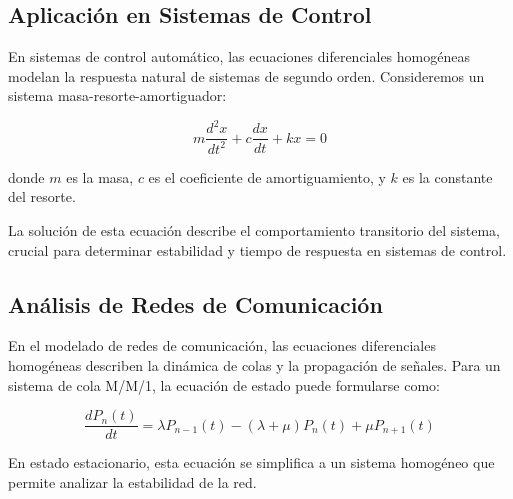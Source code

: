 \subsection{Aplicación en Sistemas de Control}

En sistemas de control automático, las ecuaciones diferenciales homogéneas modelan la respuesta natural de sistemas de segundo orden. Consideremos un sistema masa-resorte-amortiguador:

\begin{equation}
    m \frac{d^2 x}{dt^2} + c \frac{dx}{dt} + kx = 0
\end{equation}

donde $m$ es la masa, $c$ es el coeficiente de amortiguamiento, y $k$ es la constante del resorte.

La solución de esta ecuación describe el comportamiento transitorio del sistema, crucial para determinar estabilidad y tiempo de respuesta en sistemas de control.

\subsection{Análisis de Redes de Comunicación}

En el modelado de redes de comunicación, las ecuaciones diferenciales homogéneas describen la dinámica de colas y la propagación de señales. Para un sistema de cola M/M/1, la ecuación de estado puede formularse como:

\begin{equation}
    \frac{dP_n(t)}{dt} = \lambda P_{n-1}(t) - (\lambda + \mu) P_n(t) + \mu P_{n+1}(t)
\end{equation}

En estado estacionario, esta ecuación se simplifica a un sistema homogéneo que permite analizar la estabilidad de la red.
